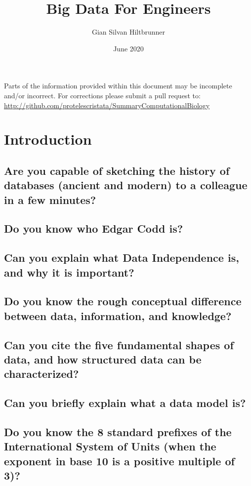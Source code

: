 \documentclass{article}
\title{Big Data For Engineers}
\author{Gian Silvan Hiltbrunner}
\date{June 2020}
\begin{document}

\maketitle

\begin{center}
    \color{red}
    \begin{framed}
    \noindent Parts of the information provided within this document may be incomplete and/or incorrect. For corrections please submit a pull request to:
    \url{http://github.com/protelescristata/SummaryComputationalBiology}
    \end{framed}
\end{center}

\section{Introduction}
\subsection{Are you capable of sketching the history of databases (ancient and modern) to a colleague in a few minutes?}
\subsection{Do you know who Edgar Codd is?}
\subsection{Can you explain what Data Independence is, and why it is important?}
\subsection{Do you know the rough conceptual difference between data, information, and knowledge?}
\subsection{Can you cite the five fundamental shapes of data, and how structured data can be characterized?}
\subsection{Can you briefly explain what a data model is?}
\subsection{Do you know the 8 standard prefixes of the International System of Units (when the exponent in base 10 is a positive multiple of 3)?}
\end{document}
